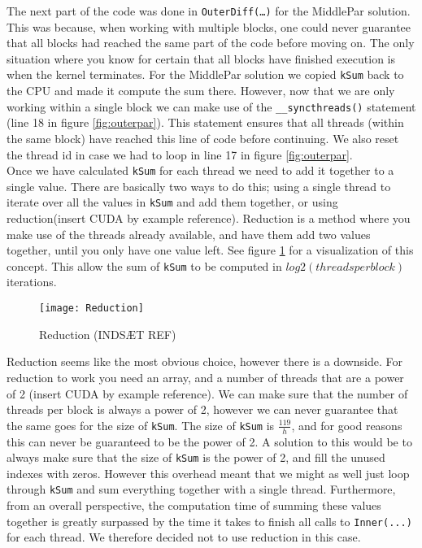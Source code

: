 The next part of the code was done in \texttt{OuterDiff(…)} for the MiddlePar solution. This was because, when working with multiple blocks, one could never guarantee that all blocks had reached the same part of the code before moving on. The only situation where you know for certain that all blocks have finished execution is when the kernel terminates. For the MiddlePar solution we copied \texttt{kSum} back to the CPU and made it compute the sum there. However, now that we are only working within a single block we can make use of the \texttt{\_\_syncthreads()} statement (line 18 in figure \ref{fig:outerpar}). This statement ensures that all threads (within the same block) have reached this line of code before continuing. We also reset the thread id in case we had to loop in line 17 in figure \ref{fig:outerpar}. \\

Once we have calculated \texttt{kSum} for each thread we need to add it together to a single value. There are basically two ways to do this; using a single thread to iterate over all the values in \texttt{kSum} and add them together, or using reduction(insert CUDA by example reference). Reduction is a method where you make use of the threads already available, and have them add two values together, until you only have one value left. See figure \ref{fig:reduction} for a visualization of this concept. This allow the sum of \texttt{kSum} to be computed in $log2(threadsperblock)$ iterations.\\

\begin{figure}[ht!]
  \centering
    \texttt{[image: Reduction]}
  \caption{Reduction (INDSÆT REF)}
  \label{fig:reduction}
\end{figure}

Reduction seems like the most obvious choice, however there is a downside. For reduction to work you need an array, and a number of threads that are a power of 2 (insert CUDA by example reference). We can make sure that the number of threads per block is always a power of 2, however we can never guarantee that the same goes for the size of \texttt{kSum}. The size of \texttt{kSum} is $\frac{119}{h}$, and for good reasons this can never be guaranteed to be the power of 2. A solution to this would be to always make sure that the size of \texttt{kSum} is the power of 2, and fill the unused indexes with zeros. However this overhead meant that we might as well just loop through \texttt{kSum} and sum everything together with a single thread. Furthermore, from an overall perspective, the computation time of summing these values together is greatly surpassed by the time it takes to finish all calls to \texttt{Inner(...)} for each thread. We therefore decided not to use reduction in this case.\\

